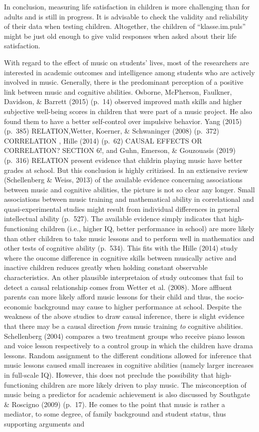 \documentclass[a4, 12pt]{article}
\begin{document}
In conclusion, measuring life satisfaction in children is more challenging than for adults and is still in progress. It is advisable to check the validity and reliability of their data when testing children.
Altogether, the children of ``klasse.im.puls'' might be just old enough to give valid responses when asked about their life satisfaction.

With regard to the effect of music on students' lives, most of the researchers are interested in academic outcomes and intelligence among students who are actively involved in music. Generally, there is the predominant perception of a positive link between music and cognitive abilities. Osborne, McPherson, Faulkner, Davidson, \& Barrett (2015) (p.~14) observed improved math skills and higher subjective well-being scores in children that were part of a music project. He also found them to have a better self-control over impulsive behavior. Yang (2015) (p.~385) RELATION,Wetter, Koerner, \& Schwaninger (2008) (p.~372) CORRELATION , Hille (2014) (p.~62) CAUSAL EFFECTS OR CORRELATION? SECTION 6!, and Guhn, Emerson, \& Gouzouasis (2019) (p.~316) RELATION present evidence that childrin playing music have better grades at school. But this conclusion is highly critizised. In an extiensive review (Schellenberg \& Weiss, 2013) of the available evidence concerning associations between music and cognitive abilities, the picture is not so clear any longer. Small associations between music training and mathematical ability in correlational and quasi-experimental studies might result from individual differences in general intellectual ability (p.~527). The available evidence simply indicates that high-functioning children (i.e., higher IQ, better performance in school) are more likely than other children to take music lessons and to perform well in mathematics and other tests of cognitive ability (p.~534). This fits with the Hille (2014) study where the oucome difference in cognitive skills between musically active and inactive children reduces greatly when holding constant observable characteristics. An other plausible interpretaion of study outcomes that fail to detect a causal relationship comes from Wetter et al. (2008). More affluent parents can more likely afford music lessons for their child and thus, the socio-economic background may cause to higher performance at school. Despite the weakness of the above studies to draw causal inference, there is slight evidence that there may be a causal direction \emph{from} music training \emph{to} cognitive abilities. Schellenberg (2004) compares a two treatment groups who receive piano lesson and voice lesson respectively to a control group in which the children have drama lessons. Random assignment to the different conditions allowed for inference that music lessons caused small increases in cognitive abilities (namely larger increases in full-scale IQ). However, this does not preclude the possibility that high-functioning children are more likely driven to play music. The misconception of music being a predictor for academic achievement is also discussed by Southgate \& Roscigno (2009) (p.~17). He comes to the point that music is rather a mediator, to some degree, of family background and student status, thus supporting arguments and 
\end{document}

